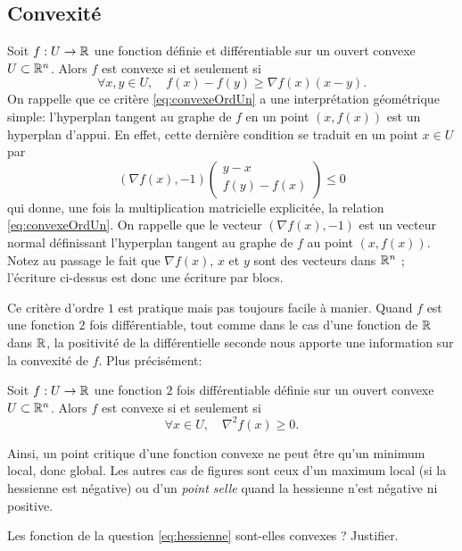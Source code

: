 \documentclass[11pt, a4paper]{article}
\begin{document}
\subsection{Convexité}

Soit $f : U \to \mathbb{R}$ une fonction définie et différentiable sur un ouvert convexe
$U \subset \mathbb{R}^n$. Alors $f$ est convexe si et seulement si
\begin{equation}
  \label{eq:convexeOrdUn}
  \forall x, y \in U, \quad f(x) - f(y) \geq \nabla{f}(x)(x-y).
\end{equation}
On rappelle que ce critère \eqref{eq:convexeOrdUn} a une
interprétation géométrique simple: l'hyperplan tangent au graphe de
$f$ en un point $(x, f(x))$ est un hyperplan d'appui. En effet, cette
dernière condition se traduit en un point $x \in U$ par
\[
(\nabla{f}(x), -1)  \begin{pmatrix}  y - x \\ f(y) - f(x) \end{pmatrix} \leq 0
\]
qui donne, une fois la multiplication matricielle explicitée, la
relation \eqref{eq:convexeOrdUn}. On rappelle que le vecteur
$(\nabla{f}(x), -1)$ est un vecteur normal définissant l'hyperplan
tangent au graphe de $f$ au point $(x, f(x))$. Notez au passage le fait
que $\nabla{f}(x)$, $x$ et $y$ sont des vecteurs dans $\mathbb{R}^n$ ;
l'écriture ci-dessus est donc une écriture par blocs.

Ce critère d'ordre $1$ est pratique mais pas toujours facile à
manier. Quand $f$ est une fonction $2$ fois différentiable, tout comme
dans le cas d'une fonction de $\mathbb{R}$ dans $\mathbb{R}$, la positivité de la
différentielle seconde nous apporte une information sur la convexité
de $f$. Plus précisément:
\begin{prop}
  Soit $f : U \to \mathbb{R}$ une fonction $2$ fois différentiable définie sur
  un ouvert convexe $U \subset \mathbb{R}^n$. Alors $f$ est convexe si et
  seulement si
  \begin{equation}
    \label{eq:convexeOrdDeux}
    \forall x \in U, \quad \nabla^2{f}(x) \geq 0.
  \end{equation}
\end{prop}

Ainsi, un point critique d'une fonction convexe ne peut être qu'un
minimum local, donc global. Les autres cas de figures sont ceux d'un
maximum local (si la hessienne est négative) ou d'un \emph{point
  selle} quand la hessienne n'est négative ni positive.

\begin{question}
  Les fonction de la question \eqref{eq:hessienne} sont-elles convexes ?
  Justifier.
\end{question}
\end{document}
